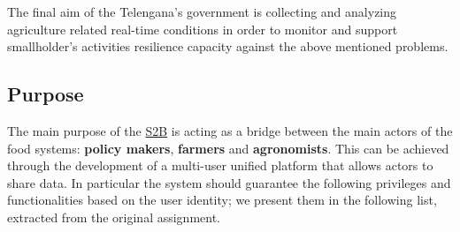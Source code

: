 The final aim of the Telengana's government is collecting and analyzing agriculture related real-time conditions in order to monitor and support smallholder's activities resilience capacity against the above mentioned problems.

\subsection{Purpose}
The main purpose of the \hyperref[tab:acronymsTable]{S2B} is acting as a bridge between the main actors of the food systems: \textbf{policy makers}, \textbf{farmers} and \textbf{agronomists}. This can be achieved through the development of a multi-user unified platform that allows actors to share data. In particular the system should guarantee the following privileges and functionalities based on the user identity; we present them in the following list, extracted from the original assignment.
